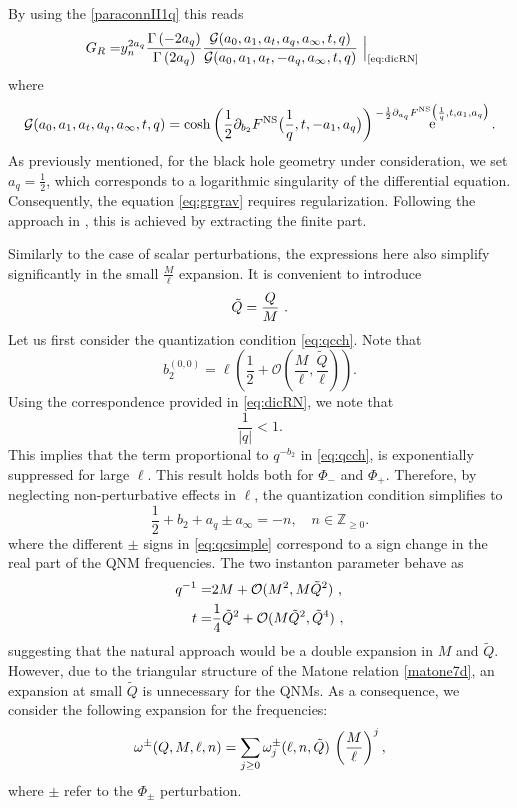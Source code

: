\documentclass[11pt]{article}
\numberwithin{equation}{section}
\newcommand{\be}{\begin{equation}}
\newcommand{\ee}{\end{equation}}
\newcommand{\ba}{\begin{aligned}}
\newcommand{\ea}{\end{aligned}}
\DeclareMathOperator{\re}{{\rm e}}
\begin{document}
By using the \eqref{paraconnII1q} this reads
\be  \label{eq:grgrav} \ba G_R=& y_n^{2a_q} {\Gamma\left(-2 a_q\right)\over \Gamma\left(2 a_q\right)}{\mathcal{G}(a_0,a_1,a_t,a_q,a_{\infty},t,q)\over \mathcal{G}(a_0,a_1,a_t,-a_q, a_{\infty},t,q)}~\Big|_{\text{\eqref{eq:dicRN}}}\ea \ee
where 
\be \mathcal{G}(a_0,a_1,a_t,a_q,a_{\infty},t,q)=\cosh\left({1\over 2}\partial_{b_2}F^{\rm NS}\big({1\over q},t,- a_1, a_q \big)\right)\re^{-\frac{1}{2}\partial_{a_q}F^{\rm NS}\big({1\over q},t, a_1, a_q\big)}.
\ee
As previously mentioned, for the black hole geometry under consideration, we set  $a_q = \frac{1}{2}$, which corresponds to a logarithmic singularity of the differential equation. Consequently, the equation \eqref{eq:grgrav} requires regularization. Following the approach in \cite{Jia:2024zes, unpGGDC}, this is achieved by extracting the finite part. %

Similarly to the case of scalar perturbations, the expressions here also simplify significantly in the small $\frac{M}{\ell} $ expansion.
It is convenient to introduce
 \be \tilde{Q}= {Q\over M}~.\ee 
Let us first consider the quantization condition \eqref{eq:qcch}.
Note that
\be
b_2^{(0,0)} = \ell \left(\frac{1}{2} + \mathcal{O}\left(\frac{M}{\ell}, \frac{\tilde{Q}}{\ell}\right)\right).
\ee
Using the correspondence provided in \eqref{eq:dicRN}, we note that
\be
\frac{1}{|q|} < 1.
\ee
This implies that the term proportional to $q^{-b_2}$ in \eqref{eq:qcch},  is exponentially suppressed for large $\ell$.
This result holds both for $\Phi_-$ and $\Phi_+$.
 Therefore, by neglecting non-perturbative effects in $\ell$, the quantization condition simplifies to
\begin{equation}\label{eq:qcsimple}
\frac{1}{2}+b_2+a_{q}\pm a_{\infty}=-n,\quad n\in\mathbb{Z}_{\ge 0}.
\end{equation}
where the different $\pm$ signs in \eqref{eq:qcsimple} correspond to a sign change in the real part of the QNM frequencies.
The two instanton parameter behave as  
\begin{equation}  \ba 
q^{-1}=&2M +\mathcal{O}(M^2, M \tilde{Q}^2 )~,\\
t = & {1\over 4}\tilde{Q}^2 + \mathcal{O}(M\tilde{Q}^2,\tilde{Q}^4)~,  
\ea
\end{equation}  
suggesting that the natural approach would be a double expansion in \( M \) and \(\tilde{Q}\). However, due to the triangular structure of the Matone relation \eqref{matone7d}, an expansion at small \(\tilde{Q}\) is unnecessary for the QNMs.  As a consequence, we consider the following expansion for the frequencies:
\begin{equation}\label{omegaexpansionRNAdS5}
\omega^{\pm}(Q,M,\ell,n)=\sum_{j\ge 0}\omega_{j}^{\pm}(\ell,n,\tilde{Q})\,\left({M\over \ell}\right)^j,
\end{equation}
where $\pm$ refer to the $\Phi_{\pm}$ perturbation.
\end{document}
